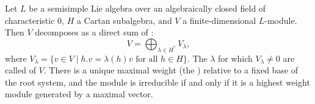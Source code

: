 Let $L$ be a semisimple Lie algebra over an algebraically closed field of characteristic 0, $H$ a Cartan subalgebra, and $V$ a finite-dimensional $L$-module. Then $V$ decomposes as a direct sum of :
$$V = \bigoplus_{\lambda \in H^*} V_\lambda,$$
where $V_\lambda = \{v \in V \mid h.v = \lambda(h)v \text{ for all } h \in H\}$. The $\lambda$ for which $V_\lambda \neq 0$ are called  of $V$. There is a unique maximal weight (the ) relative to a fixed base of the root system, and the module is irreducible if and only if it is a highest weight module generated by a maximal vector.

